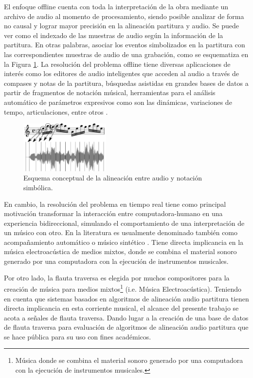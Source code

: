 \documentclass
  [ams,pdfout]%
	{aeslac}
\begin{document}
El enfoque offline cuenta con toda la interpretación de la obra mediante un archivo de audio al momento de procesamiento, siendo posible analizar de forma no causal y lograr mayor precisión en la alineación partitura y audio. Se puede ver como el indexado de las muestras de audio según la información de la partitura. En otras palabras, asociar los eventos simbolizados en la partitura con las correspondientes muestras de audio de una grabación, como se esquematiza en la Figura \ref{fig:resultado_alineacion}. La resolución del problema offline tiene diversas aplicaciones de interés como los editores de audio inteligentes que acceden al audio a través de compases y notas de la partitura, búsquedas asistidas en grandes bases de datos a partir de fragmentos de notación músical, herramientas para el análisis automático de parámetros expresivos como son las dinámicas, variaciones de tempo, articulaciones, entre otros \cite{dannenberg2006music}.

\begin{figure}[h!]
\begin{center}
\includegraphics[width=0.4\textwidth]{imagenes/resultado_alineacion} 
\caption{Esquema conceptual de la alineación entre audio y notación simbólica.}
\label{fig:resultado_alineacion}
\end{center}
\end{figure} 


En cambio, la resolución del problema en tiempo real tiene como principal motivación transformar la interacción entre computadora-humano en una experiencia bidireccional, simulando el comportamiento de una interpretación de un músico con otro. En la literatura es usualmente denominado también como acompañamiento automático o músico sintético \cite{vercoe1984synthetic}. Tiene directa implicancia en la música electroacústica de medios mixtos, donde se combina el material sonoro generado por una computadora con la ejecución de instrumentos musicales.

Por otro lado, la flauta traversa es elegida por muchos compositores para la creación de música para medios mixtos\footnote{Música donde se combina el material sonoro generado por una computadora con la ejecución de instrumentos musicales.} (i.e. Música Electroacústica). Teniendo en cuenta que sistemas basados en algoritmos de alineación audio partitura tienen directa implicancia en esta corriente musical, el alcance del presente trabajo se acota a señales de flauta traversa. Dando lugar a la creación de una base de datos de flauta traversa para evaluación de algoritmos de alineación audio partitura que se hace pública para su uso con fines académicos.
\end{document}
